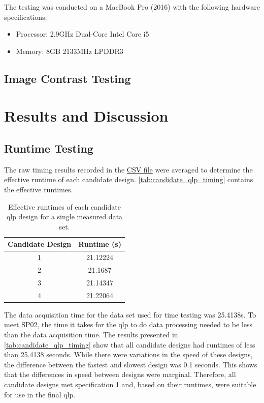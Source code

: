 \documentclass[class=report,11pt,crop=false]{standalone}
\begin{document}
    The testing was conducted on a MacBook Pro (2016) with the following hardware specifications:
    \begin{itemize}
        \item Processor: 2.9GHz Dual-Core Intel Core i5
        \item Memory: 8GB 2133MHz LPDDR3
    \end{itemize}

    \subsection{Image Contrast Testing}
    
\section{Results and Discussion}
    \subsection{Runtime Testing}
    The raw timing results recorded in the \href{}{CSV file} were averaged to determine the effective runtime of each candidate design. \autoref{tab:candidate_qlp_timing} contains the effective runtimes.
        
        \begin{table}[H]
            \centering
            \begin{tabular}{|c|c|}
                \hline
                \textbf{Candidate Design}&\textbf{Runtime (s)}\\ 
                \hline
                1   & 21.12224 \\
                \hline
                2   & 21.1687  \\ 
                \hline
                3   & 21.14347 \\ 
                \hline
                4   & 21.22064 \\ 
                \hline
            \end{tabular}
            \caption{Effective runtimes of each candidate \gls{qlp} design for a single measured data set.}
            \label{tab:candidate_qlp_timing}
        \end{table}
    The data acquisition time for the data set used for time testing was 25.4138s. To meet SP02, the time it takes for the \gls{qlp} to do data processing needed to be less than the data acquisition time. The results presented in \autoref{tab:candidate_qlp_timing} show that all candidate designs had runtimes of less than 25.4138 seconds. While there were variations in the speed of these designs, the difference between the fastest and slowest design was 0.1 seconds. This shows that the differences in speed between designs were marginal. Therefore, all candidate designs met specification 1 and, based on their runtimes, were suitable for use in the final \gls{qlp}.
\end{document}
